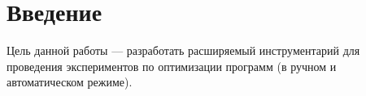 \section{Введение}
Цель данной работы --- разработать расширяемый инструментарий для проведения экспериментов по оптимизации программ (в ручном и автоматическом режиме).
